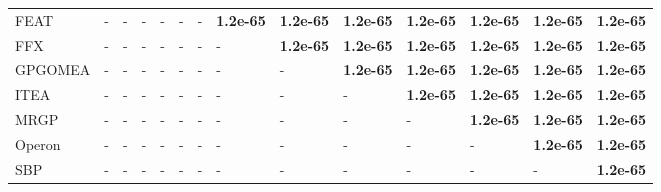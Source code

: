 \begin{table}
\begin{tabular}{llllllllllllll}
FEAT      &                - &                - &                - &                - &                - &                - &  \textbf{1.2e-65} &  \textbf{1.2e-65} &  \textbf{1.2e-65} &  \textbf{1.2e-65} &  \textbf{1.2e-65} &  \textbf{1.2e-65} &  \textbf{1.2e-65} \\
FFX       &                - &                - &                - &                - &                - &                - &                - &  \textbf{1.2e-65} &  \textbf{1.2e-65} &  \textbf{1.2e-65} &  \textbf{1.2e-65} &  \textbf{1.2e-65} &  \textbf{1.2e-65} \\
GPGOMEA   &                - &                - &                - &                - &                - &                - &                - &                - &  \textbf{1.2e-65} &  \textbf{1.2e-65} &  \textbf{1.2e-65} &  \textbf{1.2e-65} &  \textbf{1.2e-65} \\
ITEA      &                - &                - &                - &                - &                - &                - &                - &                - &                - &  \textbf{1.2e-65} &  \textbf{1.2e-65} &  \textbf{1.2e-65} &  \textbf{1.2e-65} \\
MRGP      &                - &                - &                - &                - &                - &                - &                - &                - &                - &                - &  \textbf{1.2e-65} &  \textbf{1.2e-65} &  \textbf{1.2e-65} \\
Operon    &                - &                - &                - &                - &                - &                - &                - &                - &                - &                - &                - &  \textbf{1.2e-65} &  \textbf{1.2e-65} \\
SBP       &                - &                - &                - &                - &                - &                - &                - &                - &                - &                - &                - &                - &  \textbf{1.2e-65} \\
\bottomrule
\end{tabular}
\end{table}
